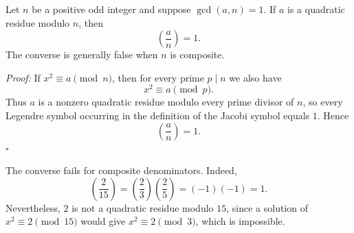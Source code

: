 \documentclass[a4paper,11pt,abstracton]{scrartcl}
\theoremstyle{dotlessP}
\theoremstyle{dotlessS}
\theoremstyle{remark}
\theoremstyle{definition}
\begin{document}
\begin{remark_box}
Let $n$ be a positive odd integer and suppose $\gcd(a,n)=1$. If $a$
is a quadratic residue modulo $n$, then
\[
    \left(\frac an\right)=1.
\]
The converse is generally false when $n$ is composite.
\end{remark_box}

\begin{claim_box}
\textit{Proof:}
If $x^2\equiv a\pmod n$, then for every prime $p\mid n$ we also have
\[
    x^2\equiv a\pmod p.
\]
Thus $a$ is a nonzero quadratic residue modulo every prime divisor of
$n$, so every Legendre symbol occurring in the definition of the
Jacobi symbol equals $1$. Hence
\[
    \left(\frac an\right)=1.
\]
\hfill$\square$
\end{claim_box}

\begin{example_box}
The converse fails for composite denominators. Indeed,
\[
    \left(\frac2{15}\right)
      =\left(\frac23\right)\left(\frac25\right)
      =(-1)(-1)=1.
\]
Nevertheless, $2$ is not a quadratic residue modulo $15$, since a
solution of $x^2\equiv2\pmod{15}$ would give
$x^2\equiv2\pmod3$, which is impossible.
\end{example_box}
\end{document}
